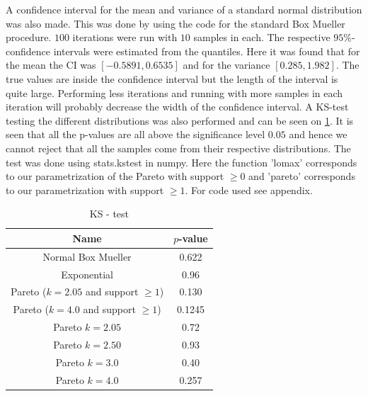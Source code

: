 A confidence interval for the mean and variance of a standard normal distribution was also made. This was done by using the code for the standard Box Mueller procedure. $100$ iterations were run with $10$ samples in each. The respective $95\%$-confidence intervals were estimated from the quantiles. Here it was found that for the mean the CI was $[-0.5891,0.6535]$ and for the variance $[0.285, 1.982]$. The true values are inside the confidence interval but the length of the interval is quite large. Performing less iterations and running with more samples in each iteration will probably decrease the width of the confidence interval. A KS-test testing the different distributions was also performed and can be seen on \ref{tab:ex3}. It is seen that all the p-values are all above the significance level $0.05$ and hence we cannot reject that all the samples come from their respective distributions. The test was done using stats.kstest in numpy. Here the function 'lomax' corresponds to our parametrization of the Pareto with support $\geq 0$ and 'pareto' corresponds to our parametrization with support $\geq 1$. For code used see appendix. 

\begin{table}[H]
    \centering
    \begin{tabular}{|c|c|} \hline
    Name & $p$-value  \\ \hline
    Normal Box Mueller & 0.622 \\ \hline
    Exponential & 0.96 \\ \hline
    Pareto ($k=2.05$ and support $\geq1$) & 0.130 \\ \hline
    Pareto ($k=4.0$ and support $\geq 1$) & 0.1245 \\ \hline
    Pareto $k=2.05$ & 0.72 \\ \hline
    Pareto $k=2.50$ & 0.93 \\ \hline
    Pareto $k=3.0$ & 0.40 \\ \hline
    Pareto $k=4.0$ & 0.257 \\ \hline
    \end{tabular}
    \caption{KS - test}
    \label{tab:ex3}
\end{table}